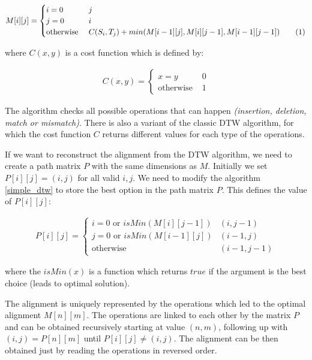 \newcommand\numberthis{\addtocounter{equation}{1}\tag{\theequation}}
\begin{align*}
  M[i][j] = \begin{cases}
    i = 0 & j \\
    j = 0 & i \\
    \text{otherwise } & C(S_{i}, T_{j}) + min(M[i-1][j], M[i][j-1], M[i-1][j-1]) \numberthis \label{simple_dtw}
  \end{cases}
\end{align*}

where $C(x, y)$ is a cost function which is defined by:

\begin{align*}
  C(x,y) = \begin{cases}
      x = y & 0 \\
      \text{otherwise } & 1
  \end{cases}
\end{align*}

The algorithm checks all possible operations that can happen \textit{(insertion, deletion, match or
mismatch)}. There is also a variant of the classic DTW algorithm, for which the cost function $C$
returns different values for each type of the operations.

If we want to reconstruct the alignment from the DTW algorithm, we need to create a path matrix $P$
with the same dimensions as $M$. Initially we set $P[i][j] = (i,j)$ for all valid $i, j$. We need to
modify the algorithm \ref{simple_dtw} to store the best option in the path matrix $P$. This defines
the value of $P[i][j]$:

\begin{align*}
  P[i][j] = \begin{cases}
      i = 0 \text{ or } isMin(M[i][j-1]) & (i, j-1) \\
      j = 0 \text{ or } isMin(M[i-1][j]) & (i-1, j) \\
      \text{otherwise} & (i-1, j-1)
  \end{cases}
\end{align*}

where the $isMin(x)$ is a function which returns $true$ if the argument is the best choice (leads to
optimal solution).

The alignment is uniquely represented by the operations which led to the optimal alignment
$M[n][m]$. The operations are linked to each other by the matrix $P$ and can be obtained recursively
starting at value $(n, m)$, following up with $(i,j) = P[n][m]$ until $P[i][j] \ne (i, j)$. The
alignment can be then obtained just by reading the operations in reversed order.

